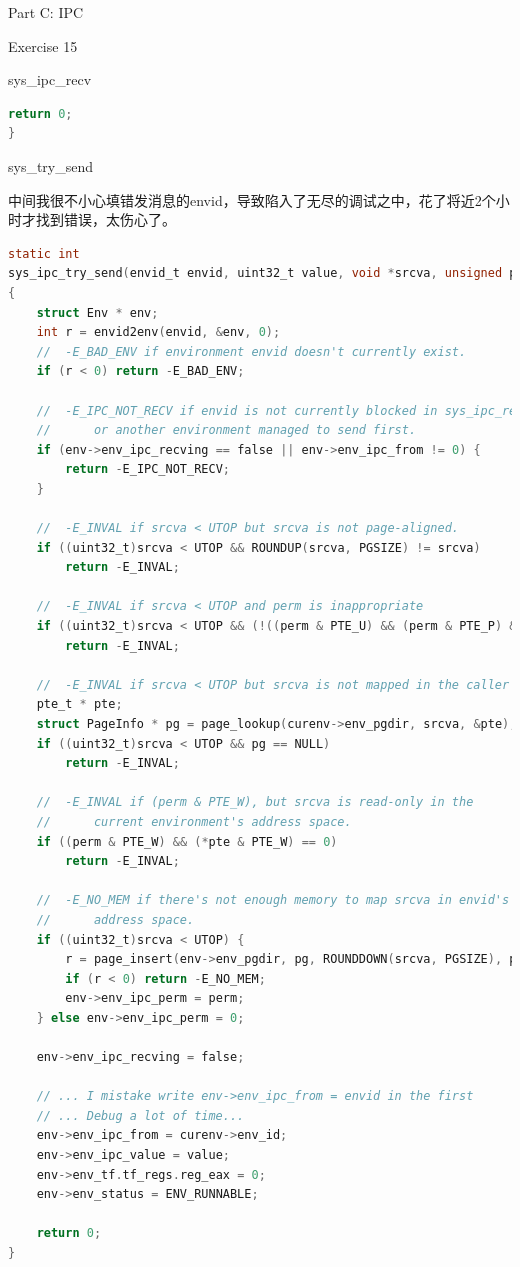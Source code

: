 \documentclass[GBK,winfonts,a4paper,10pt]{ctexart}
\begin{document}
\begin{section}{ Part C: IPC }
\begin{subsection}{ Exercise 15 }
\begin{subsection}{ sys\_ipc\_recv }
\begin{lstlisting}[language = C]
	return 0;
}
\end{lstlisting}
\end{subsection}

\begin{subsection}{ sys\_try\_send }
\par
中间我很不小心填错发消息的envid，导致陷入了无尽的调试之中，花了将近2个小时才找到错误，太伤心了。
\begin{lstlisting}[language = C]
static int
sys_ipc_try_send(envid_t envid, uint32_t value, void *srcva, unsigned perm)
{
	struct Env * env;
	int r = envid2env(envid, &env, 0);	
	//	-E_BAD_ENV if environment envid doesn't currently exist.
	if (r < 0) return -E_BAD_ENV;

	//	-E_IPC_NOT_RECV if envid is not currently blocked in sys_ipc_recv,
	//		or another environment managed to send first.
	if (env->env_ipc_recving == false || env->env_ipc_from != 0) {
		return -E_IPC_NOT_RECV;
	}

	//	-E_INVAL if srcva < UTOP but srcva is not page-aligned.
	if ((uint32_t)srcva < UTOP && ROUNDUP(srcva, PGSIZE) != srcva)
		return -E_INVAL;

	//	-E_INVAL if srcva < UTOP and perm is inappropriate
	if ((uint32_t)srcva < UTOP && (!((perm & PTE_U) && (perm & PTE_P) && (perm & (~PTE_SYSCALL))==0))) 
		return -E_INVAL;

	//	-E_INVAL if srcva < UTOP but srcva is not mapped in the caller's address space 
	pte_t * pte;
	struct PageInfo * pg = page_lookup(curenv->env_pgdir, srcva, &pte);
	if ((uint32_t)srcva < UTOP && pg == NULL)
		return -E_INVAL;

	//	-E_INVAL if (perm & PTE_W), but srcva is read-only in the
	//		current environment's address space.
	if ((perm & PTE_W) && (*pte & PTE_W) == 0) 
		return -E_INVAL;

	//	-E_NO_MEM if there's not enough memory to map srcva in envid's
	//		address space.
	if ((uint32_t)srcva < UTOP) {
		r = page_insert(env->env_pgdir, pg, ROUNDDOWN(srcva, PGSIZE), perm);
		if (r < 0) return -E_NO_MEM;
		env->env_ipc_perm = perm;
	} else env->env_ipc_perm = 0;

	env->env_ipc_recving = false;

	// ... I mistake write env->env_ipc_from = envid in the first
	// ... Debug a lot of time...
	env->env_ipc_from = curenv->env_id;
	env->env_ipc_value = value;
	env->env_tf.tf_regs.reg_eax = 0;
	env->env_status = ENV_RUNNABLE;

	return 0;
}
\end{lstlisting}
\end{subsection}


\end{subsection}
\end{section}
\end{document}
